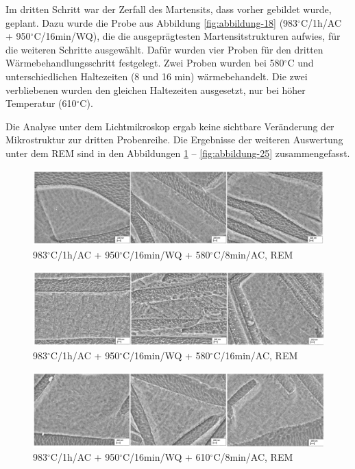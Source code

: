Im dritten Schritt war der Zerfall des Martensits, dass vorher gebildet wurde, geplant. Dazu wurde die Probe aus Abbildung \ref{fig:abbildung-18} (983$^\circ$C/1h/AC + 950$^\circ$C/16min/WQ), die die ausgeprägtesten Martensitstrukturen aufwies, für die weiteren Schritte ausgewählt. 
Dafür wurden vier Proben für den dritten Wärmebehandlungsschritt festgelegt. Zwei Proben wurden bei 580$^\circ$C und unterschiedlichen Haltezeiten (8 und 16 min) wärmebehandelt. Die zwei verbliebenen wurden den gleichen Haltezeiten ausgesetzt, nur bei höher Temperatur (610$^\circ$C).

Die Analyse unter dem Lichtmikroskop ergab keine sichtbare Veränderung der Mikrostruktur zur dritten Probenreihe. Die Ergebnisse der weiteren Auswertung unter dem REM sind in den Abbildungen \ref{fig:abbildung-22} -- \ref{fig:abbildung-25} zusammengefasst.

\begin{figure}
	\centering
	\includegraphics[width=1.0\linewidth]{./Bilder/Abbildung 22.png}
	\caption[Abbildung 22]{983$^\circ$C/1h/AC + 950$^\circ$C/16min/WQ + 580$^\circ$C/8min/AC, REM}
	\label{fig:abbildung-22}
\end{figure}

\begin{figure}
	\centering
	\includegraphics[width=1.0\linewidth]{./Bilder/Abbildung 23.png}
	\caption[Abbildung 23]{983$^\circ$C/1h/AC + 950$^\circ$C/16min/WQ + 580$^\circ$C/16min/AC, REM}
	\label{fig:abbildung-23}
\end{figure}

\begin{figure}
	\centering
	\includegraphics[width=1.0\linewidth]{./Bilder/Abbildung 24.png}
	\caption[Abbildung 24]{983$^\circ$C/1h/AC + 950$^\circ$C/16min/WQ + 610$^\circ$C/8min/AC, REM}
	\label{fig:abbildung-24}
\end{figure}

